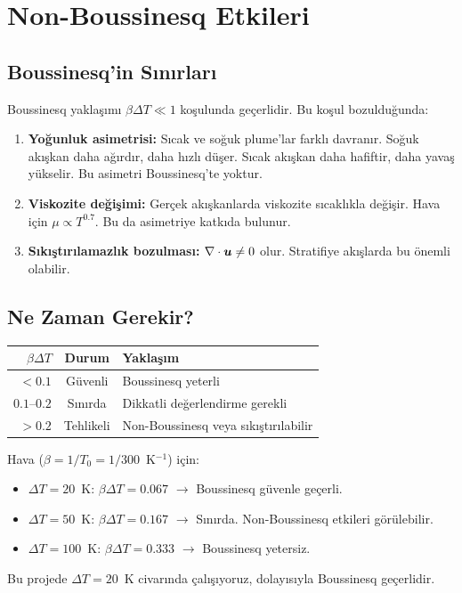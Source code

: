 \section{Non-Boussinesq Etkileri}
\label{sec:non_boussinesq}

\subsection{Boussinesq'in Sınırları}

Boussinesq yaklaşımı $\beta\Delta T \ll 1$ koşulunda geçerlidir. Bu koşul bozulduğunda:

\begin{enumerate}
    \item \textbf{Yoğunluk asimetrisi:} Sıcak ve soğuk plume'lar farklı davranır. Soğuk akışkan daha ağırdır, daha hızlı düşer. Sıcak akışkan daha hafiftir, daha yavaş yükselir. Bu asimetri Boussinesq'te yoktur.

    \item \textbf{Viskozite değişimi:} Gerçek akışkanlarda viskozite sıcaklıkla değişir. Hava için $\mu \propto T^{0.7}$. Bu da asimetriye katkıda bulunur.

    \item \textbf{Sıkıştırılamazlık bozulması:} $\nabla \cdot\bm{u} \neq 0$ olur. Stratifiye akışlarda bu önemli olabilir.
\end{enumerate}

\subsection{Ne Zaman Gerekir?}

\begin{center}
\begin{tabular}{rcl}
\toprule
$\beta\Delta T$ & \textbf{Durum} & \textbf{Yaklaşım} \\
\midrule
$< 0.1$ & Güvenli & Boussinesq yeterli \\
$0.1$--$0.2$ & Sınırda & Dikkatli değerlendirme gerekli \\
$> 0.2$ & Tehlikeli & Non-Boussinesq veya sıkıştırılabilir \\
\bottomrule
\end{tabular}
\end{center}

\begin{example}
Hava ($\beta = 1/T_0 = 1/300$~K$^{-1}$) için:
\begin{itemize}
    \item $\Delta T = 20$~K: $\beta\Delta T = 0.067$ $\to$ Boussinesq güvenle geçerli.
    \item $\Delta T = 50$~K: $\beta\Delta T = 0.167$ $\to$ Sınırda. Non-Boussinesq etkileri görülebilir.
    \item $\Delta T = 100$~K: $\beta\Delta T = 0.333$ $\to$ Boussinesq yetersiz.
\end{itemize}
Bu projede $\Delta T = 20$~K civarında çalışıyoruz, dolayısıyla Boussinesq geçerlidir.
\end{example}

